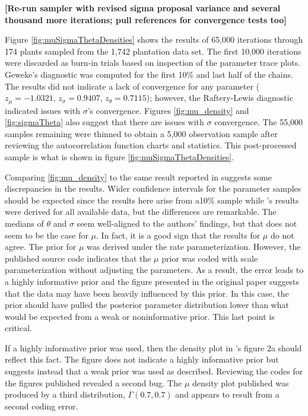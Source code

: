 \documentclass{uwstat572}
\begin{document}
\textbf{[Re-run sampler with revised sigma proposal variance and several thousand more iterations; pull references for convergence tests too]}

Figure \ref{fig:muSigmaThetaDensities} shows the results of 65,000 iterations through 174 plants sampled from the 1,742 plantation data set. 
The first 10,000 iterations were discarded as burn-in trials based on inspection of the parameter trace plots. 
Geweke's diagnostic was computed for the first 10\% and last half of the chains. 
The results did not indicate a lack of convergence for any parameter ($z_{\mu} = -1.0321$, $z_{\sigma} = 0.9407$,  $z_{\theta} = 0.7115$); however, the Raftery-Lewis diagnostic indicated issues with $\sigma$'s convergence. 
Figures \ref{fig:mu_density} and \ref{fig:sigmaTheta} also suggest that there are issues with $\sigma$ convergence. 
The 55,000 samples remaining were thinned to obtain a 5,000 observation sample after reviewing the autocorrelation function charts and statistics. 
This post-processed sample is what is shown in figure \ref{fig:muSigmaThetaDensities}. 

Comparing \ref{fig:mu_density} to the same result reported in \citet{Brown} suggests some discrepancies in the results. 
Wider confidence intervals for the parameter samples should be expected since the results here arise from a10\% sample while \cite{Brown}'s results were derived for all available data, but the differences are remarkable. 
The medians of $\theta$ and $\sigma$ seem well-aligned to the authors' findings, but that does not seem to be the case for $\mu$. 
In fact, it is a good sign that the results for $\mu$ do not agree. 
The prior for $\mu$ was derived under the rate parameterization. 
However, the published source code indicates that the $\mu$ prior was coded with scale parameterization without adjusting the parameters.
As a result, the error leads to a highly informative prior and the figure presented in the original paper suggests that the data may have been heavily influenced by this prior. 
In this case, the prior should have pulled the posterior parameter distribution lower than what would be expected from a weak or noninformative prior. 
This last point is critical. 

If a highly informative prior was used, then the density plot in \citet{Brown}'s figure 2a should reflect this fact. 
The figure does not indicate a highly informative prior but suggests instead that a weak prior was used as described. 
Reviewing the codes for the figures published revealed a second bug. 
The  $\mu$ density plot published was produced by a third distribution, $\Gamma(0.7, 0.7)$ and appears to result from a second coding error. 
\end{document}
